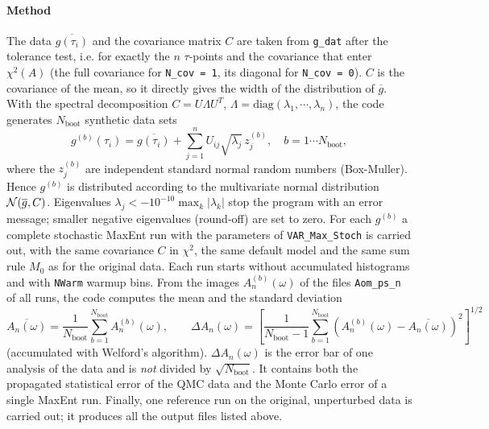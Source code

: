 \paragraph*{Method}
The  data $\overline{g(\tau_i)}$ and the covariance  matrix  $C$ are  taken  from \texttt{g\_dat} after  the tolerance test,  i.e. for exactly
the $n$  $\tau$-points  and  the  covariance  that enter $\chi^2(A)$  (the  full  covariance  for  \texttt{N\_cov = 1}, its  diagonal  for
\texttt{N\_cov = 0}).    $C$ is the covariance of the mean, so it directly gives the width of the distribution of $\overline{g}$.
With  the  spectral  decomposition  $C = U \Lambda U^{T}$,  $\Lambda = \mathrm{diag}(\lambda_1,\cdots,\lambda_n)$,  the code  generates
$N_{\mathrm{boot}}$ synthetic  data  sets
\begin{equation}
  g^{(b)}(\tau_i) = \overline{g(\tau_i)} + \sum_{j=1}^{n} U_{ij} \sqrt{\lambda_j}\, z^{(b)}_j ,  \quad   b = 1 \cdots N_{\mathrm{boot}},
\end{equation}
where  the $z^{(b)}_j$ are independent standard normal random numbers (Box-Muller).  Hence  $g^{(b)}$ is  distributed according to
the multivariate normal distribution ${\cal N}(\overline{g}, C)$.   Eigenvalues  $\lambda_j < -10^{-10} \max_k |\lambda_k|$  stop the  program with an
error  message;  smaller  negative  eigenvalues (round-off) are set  to zero.  For each  $g^{(b)}$ a  complete  stochastic
MaxEnt  run  with  the  parameters of  \texttt{VAR\_Max\_Stoch}   is  carried out,  with the   same  covariance $C$ in $\chi^2$,  the  same
default model  and  the  same  sum  rule $M_0$  as  for  the  original data.  Each  run  starts  without  accumulated  histograms  and  with
\texttt{NWarm} warmup bins.   From  the  images $A^{(b)}_n(\omega)$ of the files  \texttt{Aom\_ps\_n}  of all runs,  the  code  computes  the mean
and the  standard  deviation
\begin{equation}
   \overline{A_n(\omega)} = \frac{1}{N_{\mathrm{boot}}} \sum_{b=1}^{N_{\mathrm{boot}}} A^{(b)}_n(\omega), \qquad
   \Delta A_n(\omega) = \left[ \frac{1}{N_{\mathrm{boot}}-1} \sum_{b=1}^{N_{\mathrm{boot}}} \left( A^{(b)}_n(\omega) - \overline{A_n(\omega)}\right)^2 \right]^{1/2}
\end{equation}
(accumulated  with  Welford's  algorithm).  $\Delta A_n(\omega)$ is  the error bar of  one analysis of the data and is \emph{not} divided by
$\sqrt{N_{\mathrm{boot}}}$.  It  contains  both  the  propagated  statistical  error of the  QMC data and  the  Monte Carlo  error of a single
MaxEnt run.   Finally,  one  reference  run on the original, unperturbed  data  is  carried  out;  it  produces  all  the  output  files listed
above.


